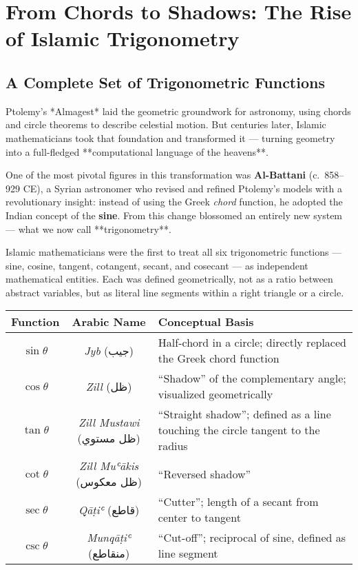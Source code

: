 \section{From Chords to Shadows: The Rise of Islamic Trigonometry}


\subsection{A Complete Set of Trigonometric Functions}

Ptolemy’s *Almagest* laid the geometric groundwork for astronomy, using chords and circle theorems to describe celestial motion. But centuries later, Islamic mathematicians took that foundation and transformed it — turning geometry into a full-fledged **computational language of the heavens**.

One of the most pivotal figures in this transformation was \textbf{Al-Battani} (c.~858–929 CE), a Syrian astronomer who revised and refined Ptolemy’s models with a revolutionary insight: instead of using the Greek \textit{chord} function, he adopted the Indian concept of the \textbf{sine}. From this change blossomed an entirely new system — what we now call **trigonometry**.

Islamic mathematicians were the first to treat all six trigonometric functions — sine, cosine, tangent, cotangent, secant, and cosecant — as independent mathematical entities. Each was defined geometrically, not as a ratio between abstract variables, but as literal line segments within a right triangle or a circle.

\begin{center}
\renewcommand{\arraystretch}{1.4}
\begin{tabular}{|c|c|p{6cm}|}
\hline
\textbf{Function} & \textbf{Arabic Name} & \textbf{Conceptual Basis} \\
\hline
\( \sin \theta \) & \textit{Jyb} (جيب) & Half-chord in a circle; directly replaced the Greek chord function \\
\( \cos \theta \) & \textit{Zill} (ظل) & “Shadow” of the complementary angle; visualized geometrically \\
\( \tan \theta \) & \textit{Zill Mustawi} (ظل مستوي) & “Straight shadow”; defined as a line touching the circle tangent to the radius \\
\( \cot \theta \) & \textit{Zill Muʿākis} (ظل معكوس) & “Reversed shadow” \\
\( \sec \theta \) & \textit{Qāṭiʿ} (قاطع) & “Cutter”; length of a secant from center to tangent \\
\( \csc \theta \) & \textit{Munqāṭiʿ} (منقاطع) & “Cut-off”; reciprocal of sine, defined as line segment \\
\hline
\end{tabular}
\end{center}

